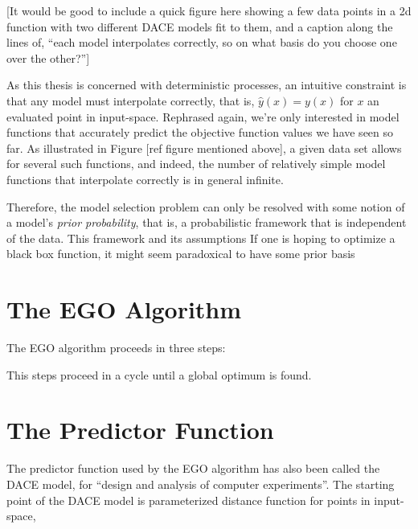 \documentclass[letterpaper]{article}
\begin{document}
[It would be good to include a quick figure here showing a few data points in a 2d function with two different DACE models fit to them, and a caption along the lines of, ``each model interpolates correctly, so on what basis do you choose one over the other?'']

As this thesis is concerned with deterministic processes, an intuitive constraint is that any model must interpolate correctly, that is, $\hat{y}(x) = y(x)$ for $x$ an evaluated point in input-space. Rephrased again, we're only interested in model functions that accurately predict the objective function values we have seen so far. As illustrated in Figure [ref figure mentioned above], a given data set allows for several such functions, and indeed, the number of relatively simple model functions that interpolate correctly is in general infinite.

Therefore, the model selection problem can only be resolved with some notion of a model's \emph{prior probability}, that is, a probabilistic framework that is independent of the data. This framework and its assumptions
If one is hoping to optimize a black box function, it might seem paradoxical to have some prior basis



\section{The EGO Algorithm}
The EGO algorithm \cite{jones_efficient_1998} proceeds in three steps:



%

This steps proceed in a cycle until a global optimum is found.


\section{The Predictor Function}

The predictor function used by the EGO algorithm has also been called the DACE model, for ``design and analysis of computer experiments''. The starting point of the DACE model is parameterized distance function for points in input-space,
\end{document}
